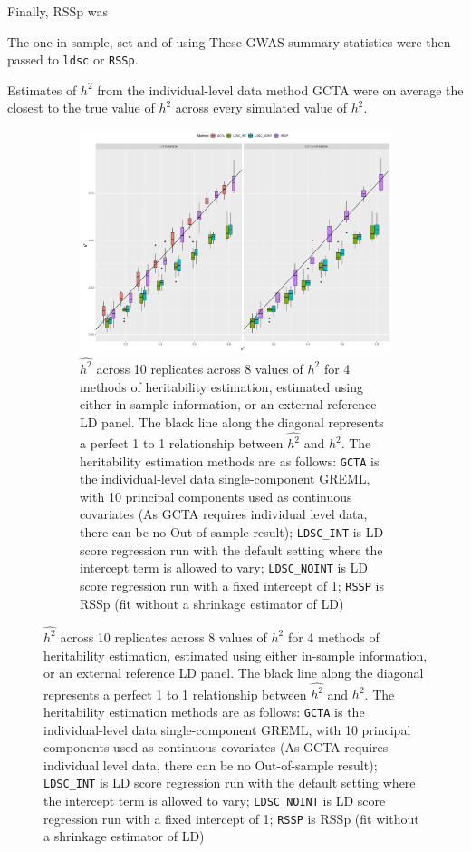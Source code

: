 Finally, RSSp was 



The  one in-sample, set and  of using These GWAS summary statistics were then passed to \texttt{ldsc} or \texttt{RSSp}.


Estimates of $h^2$ from the individual-level data method GCTA were on average the closest to the true value of $h^2$ across every simulated value of $h^2$. 



  \begin{figure}
      \centering
  \begin{subfigure}[t]{\textwidth}
    \centering
    \includegraphics[width=.9\linewidth]{img/rsspnld_v_ldsc_v_gcta.png}
    \caption{$\hat{h^2}$ across 10 replicates across 8 values of $h^2$ for 4 methods of heritability estimation, estimated using either in-sample information, or an external reference LD panel. The black line along the diagonal represents a perfect 1 to 1 relationship between $\hat{h^2}$ and $h^2$.    The heritability estimation methods are as follows: 
    \texttt{GCTA} is the individual-level data single-component GREML, with 10 principal components used as continuous covariates (As GCTA requires individual level data, there can be no Out-of-sample result);
    \texttt{LDSC\_INT} is LD score regression \cite{ldsc} run with the default setting where the intercept term is allowed to vary; 
    \texttt{LDSC\_NOINT} is LD score regression run with a fixed intercept of 1;
    \texttt{RSSP} is RSSp (fit without a shrinkage estimator of LD)}\label{fig:rssp_method_comparison}
  \end{subfigure}
\end{figure}


